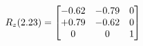 \documentclass[preview]{standalone}
\begin{document}
\begin{align*}
\special{dvisvgm:raw <g id='unique000'>}R_{z}(2.23) = \begin{bmatrix}-0.62 & -0.79 & 0 \\+0.79 & -0.62 & 0 \\0 & 0 & 1\end{bmatrix}\special{dvisvgm:raw </g>}
\end{align*}
\end{document}
